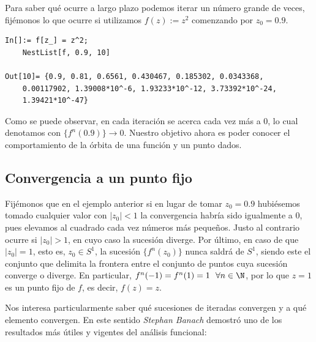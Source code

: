 Para saber qué ocurre a largo plazo podemos iterar un número grande de veces, fijémonos lo que ocurre si utilizamos $f(z):=z^2$ comenzando por $z_0=0.9$.

\begin{verbatim}
In[]:= f[z_] = z^2;
    NestList[f, 0.9, 10]
    
Out[10]= {0.9, 0.81, 0.6561, 0.430467, 0.185302, 0.0343368,
    0.00117902, 1.39008*10^-6, 1.93233*10^-12, 3.73392*10^-24, 
    1.39421*10^-47}
\end{verbatim}

Como se puede observar, en cada iteración se acerca cada vez más a $0$, lo cual denotamos con $\{f^n(0.9)\}\rightarrow 0$. Nuestro objetivo ahora es poder conocer el comportamiento de la órbita de una función y un punto dados. 

\subsection{Convergencia a un punto fijo}

Fijémonos que en el ejemplo anterior si en lugar de tomar $z_0=0.9$ hubiésemos tomado cualquier valor con $|z_0|<1$ la convergencia habría sido igualmente a $0$, pues elevamos al cuadrado cada vez números más pequeños. Justo al contrario ocurre si $|z_0|>1$, en cuyo caso la sucesión diverge. Por último, en caso de que $|z_0|=1$, esto es, $z_0\in S^1$, la sucesión $\{f^n(z_0)\}$ nunca saldrá de $S^1$, siendo este el conjunto que delimita la frontera entre el conjunto de puntos cuya sucesión converge o diverge. En particular, $f^n(-1)=f^n(1)=1\ \ \forall n\in\N$, por lo que $z=1$ es un punto fijo de $f$, es decir, $f(z)=z$. 

Nos interesa particularmente saber qué sucesiones de iteradas convergen y a qué elemento convergen. En este sentido \textit{Stephan Banach} demostró uno de los resultados más útiles y vigentes del análisis funcional:

